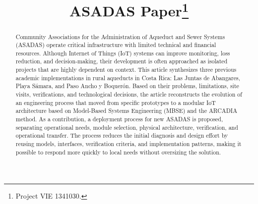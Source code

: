 \documentclass[conference]{IEEEtran}
\begin{document}
\title{ASADAS Paper\thanks{Project VIE 1341030.}}

\author{
\and
{}
\and
{}
\and
{}
}

\maketitle

\begin{abstract}
Community Associations for the Administration of Aqueduct and Sewer Systems (ASADAS) operate critical infrastructure with limited technical and financial resources. Although Internet of Things (IoT) systems can improve monitoring, loss reduction, and decision-making, their development is often approached as isolated projects that are highly dependent on context. This article synthesizes three previous academic implementations in rural aqueducts in Costa Rica: Las Juntas de Abangares, Playa Sámara, and Paso Ancho y Boquerón. Based on their problems, limitations, site visits, verifications, and technological decisions, the article reconstructs the evolution of an engineering process that moved from specific prototypes to a modular IoT architecture based on Model-Based Systems Engineering (MBSE) and the ARCADIA method. As a contribution, a deployment process for new ASADAS is proposed, separating operational needs, module selection, physical architecture, verification, and operational transfer. The process reduces the initial diagnosis and design effort by reusing models, interfaces, verification criteria, and implementation patterns, making it possible to respond more quickly to local needs without oversizing the solution.
\end{abstract}
\end{document}
